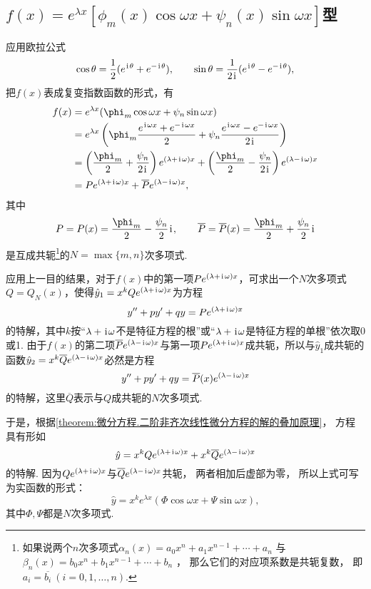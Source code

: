 \subsection{\texorpdfstring{\(f(x) = e^{\lambda x} [ \phi_m(x) \cos\omega x + \psi_n(x) \sin \omega x ]\)型}{第二类：指数函数与广义三角函数的乘积}}
应用欧拉公式\[
\cos\theta = \frac{1}{2}(e^{\kern1pt\mathrm{i}\kern1pt\theta}+e^{-\kern1pt\mathrm{i}\kern1pt\theta}),
\qquad
\sin\theta = \frac{1}{2\kern1pt\mathrm{i}\kern1pt}(e^{\kern1pt\mathrm{i}\kern1pt\theta}-e^{-\kern1pt\mathrm{i}\kern1pt\theta}),
\]把\(f(x)\)表成复变指数函数的形式，有\begin{align*}
f(x) &= e^{\lambda x} ( \phi_m \cos \omega x + \psi_n \sin \omega x ) \\
&= e^{\lambda x} \left(
\phi_m \frac{e^{\iu\omega x}+e^{-\iu\omega x}}{2}
+ \psi_n \frac{e^{\iu\omega x}-e^{-\iu\omega x}}{2\iu}
\right) \\
&= \left(\frac{\phi_m}{2}+\frac{\psi_n}{2\iu}\right) e^{(\lambda+\iu\omega)x}
+ \left(\frac{\phi_m}{2}-\frac{\psi_n}{2\iu}\right) e^{(\lambda-\iu\omega)x} \\
&= P e^{(\lambda+\iu\omega)x}
+ \overline{P} e^{(\lambda-\iu\omega)x},
\end{align*}
其中\[
P = P(x) = \frac{\phi_m}{2} - \frac{\psi_n}{2}\iu,
\qquad
\overline{P} = \overline{P}(x) = \frac{\phi_m}{2}+\frac{\psi_n}{2}\iu
\]是互成共轭\footnote{%
如果说两个\(n\)次多项式\(\alpha_n(x) = a_0 x^n + a_1 x^{n-1} + \dotsb + a_n\)
与\(\beta_n(x) = b_0 x^n + b_1 x^{n-1} + \dotsb + b_n\) ，
那么它们的对应项系数是共轭复数，
即\(a_i = \overline{b_i}\ (i=0,1,\dotsc,n)\).}的\(N = \max\{m,n\}\)次多项式.

应用上一目的结果，对于\(f(x)\)中的第一项\(P e^{(\lambda+\kern1pt\mathrm{i}\kern1pt\omega)x}\)，可求出一个\(N\)次多项式\(Q = Q_N(x)\)，使得\(\hat{y}_1 = x^k Q e^{(\lambda+\kern1pt\mathrm{i}\kern1pt\omega)x}\)为方程\[
y'' + p y' + q y = P e^{(\lambda+\kern1pt\mathrm{i}\kern1pt\omega)x}
\]的特解，其中\(k\)按“\(\lambda+\kern1pt\mathrm{i}\kern1pt\omega\)不是特征方程的根”或“\(\lambda+\kern1pt\mathrm{i}\kern1pt\omega\)是特征方程的单根”依次取0或1.
由于\(f(x)\)的第二项\(\overline{P} e^{(\lambda-\kern1pt\mathrm{i}\kern1pt\omega)x}\)与第一项\(P e^{(\lambda+\kern1pt\mathrm{i}\kern1pt\omega)x}\)成共轭，所以与\(\hat{y}_1\)成共轭的函数\(\hat{y}_2 = x^k \overline{Q} e^{(\lambda-\kern1pt\mathrm{i}\kern1pt\omega)x}\)必然是方程\[
y'' + p y' + q y = \overline{P}(x) e^{(\lambda-\kern1pt\mathrm{i}\kern1pt\omega)x}
\]的特解，这里\(\overline{Q}\)表示与\(Q\)成共轭的\(N\)次多项式.

于是，根据\cref{theorem:微分方程.二阶非齐次线性微分方程的解的叠加原理}，
方程  具有形如\[
\hat{y} = x^k Q e^{(\lambda+\kern1pt\mathrm{i}\kern1pt\omega)x} + x^k \overline{Q} e^{(\lambda-\kern1pt\mathrm{i}\kern1pt\omega)x}
\]的特解.
因为\(Q e^{(\lambda+\kern1pt\mathrm{i}\kern1pt\omega)x}\)与\(\overline{Q} e^{(\lambda-\kern1pt\mathrm{i}\kern1pt\omega)x}\)共轭，
两者相加后虚部为零，
所以上式可写为实函数的形式：
\begin{equation}
\hat{y} = x^k e^{\lambda x} (\Phi \cos\omega x + \Psi \sin\omega x),
\end{equation}
其中\(\Phi,\Psi\)都是\(N\)次多项式.

